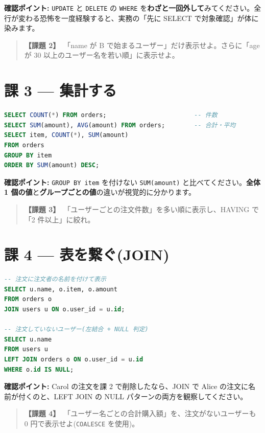 \documentclass{article}
\begin{document}
\textbf{確認ポイント:} \texttt{UPDATE} と \texttt{DELETE} の \texttt{WHERE} を\textbf{わざと一回外して}みてください。全行が変わる恐怖を一度経験すると、実務の「先に SELECT で対象確認」が体に染みます。

\begin{quote}
\textbf{【課題 2】}\ 「name が B で始まるユーザー」だけ表示せよ。さらに「age が 30 以上のユーザー名を若い順」に表示せよ。
\end{quote}

\section{課 3 — 集計する}

\begin{lstlisting}[language=SQL]
SELECT COUNT(*) FROM orders;                        -- 件数
SELECT SUM(amount), AVG(amount) FROM orders;        -- 合計・平均
SELECT item, COUNT(*), SUM(amount)
FROM orders
GROUP BY item
ORDER BY SUM(amount) DESC;
\end{lstlisting}

\textbf{確認ポイント:} \texttt{GROUP BY item} を付けない \texttt{SUM(amount)} と比べてください。\textbf{全体 1 個の値}と\textbf{グループごとの値}の違いが視覚的に分かります。

\begin{quote}
\textbf{【課題 3】}\ 「ユーザーごとの注文件数」を多い順に表示し、HAVING で「2 件以上」に絞れ。
\end{quote}

\section{課 4 — 表を繋ぐ(JOIN)}

\begin{lstlisting}[language=SQL]
-- 注文に注文者の名前を付けて表示
SELECT u.name, o.item, o.amount
FROM orders o
JOIN users u ON o.user_id = u.id;

-- 注文していないユーザー(左結合 + NULL 判定)
SELECT u.name
FROM users u
LEFT JOIN orders o ON o.user_id = u.id
WHERE o.id IS NULL;
\end{lstlisting}

\textbf{確認ポイント:} Carol の注文を課 2 で削除したなら、JOIN で Alice の注文に名前が付くのと、LEFT JOIN の NULL パターンの両方を観察してください。

\begin{quote}
\textbf{【課題 4】}\ 「ユーザー名ごとの合計購入額」を、注文がないユーザーも 0 円で表示せよ(\texttt{COALESCE} を使用)。
\end{quote}
\end{document}
